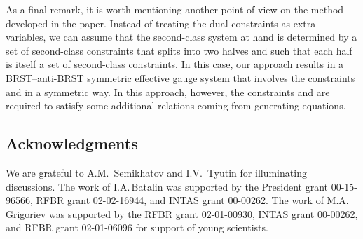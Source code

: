 \documentclass[a4paper,12pt]{amsart}
\numberwithin{equation}{section}
\begin{document}
As a final remark, it is worth mentioning another point of view on the
method developed in the paper.  Instead of treating the dual
constraints \myHighlight{$\bar\theta_\alpha$}\coordHE{} as extra variables, we can assume that
the second-class system at hand is determined by a set of second-class
constraints that splits into two halves \myHighlight{$\theta_\alpha$}\coordHE{} and
\myHighlight{$\bar\theta_\alpha$}\coordHE{} such that each half is itself a set of
second-class constraints.  In this case, our approach results in a
BRST--anti-BRST symmetric effective gauge system that involves the
constraints \myHighlight{$\theta$}\coordHE{} and \myHighlight{$\bar\theta$}\coordHE{} in a symmetric way.  In this
approach, however, the constraints \myHighlight{$\theta$}\coordHE{} and \myHighlight{$\bar\theta$}\coordHE{} are
required to satisfy some additional relations coming from generating
equations.




\subsection*{Acknowledgments} We are grateful to 
A.M.~Semikhatov and I.V.~Tyutin for illuminating discussions.  The
work of {I.A.\,Batalin} was supported by the President grant
00-15-96566, RFBR grant 02-02-16944, and INTAS grant 00-00262.  The work
of {M.A.\,Grigoriev} was supported by the RFBR grant 02-01-00930,
INTAS grant 00-00262, and RFBR grant 02-01-06096 for support of young 
scientists.
\end{document}
